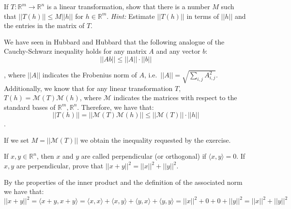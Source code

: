    \begin{exercise}{10}
        If $T: \mathbb{R}^m \rightarrow \mathbb{R}^n$ is a linear transformation, show that there is a number $M$ such that $\lvert \lvert T(h) \rvert \rvert \leq M \lvert \lvert h \rvert \rvert$ for $h \in \mathbb{R}^m$. \textit{Hint:} Estimate $\lvert \lvert T(h) \rvert \rvert$ in terms of $\lvert \lvert h \rvert \rvert$ and the entries in the matrix of $T$.
    \end{exercise}

    \begin{solution}

        We have seen in Hubbard and Hubbard that the following analogue of the Cauchy-Schwarz inequality holds for any matrix $A$ and any vector $b$:
        $$\lvert \lvert A b \rvert \rvert \leq \lvert \lvert A \rvert \rvert \cdot \lvert \lvert b \rvert \rvert$$

        , where $\lvert \lvert A \rvert \rvert$ indicates the Frobenius norm of $A$, i.e.\ $\lvert \lvert A \rvert \rvert = \sqrt{\sum_{i, j} A_{i, j}^2}$. Additionally, we know that for any linear transformation $T$, $T(h) = \mathcal{M}(T)\mathcal{M}(h)$, where $\mathcal{M}$ indicates the matrices with respect to the standard bases of $\mathbb{R}^m, \mathbb{R}^n$. Therefore, we have that:
        $$\lvert \lvert T(h) \rvert \rvert = \lvert \lvert \mathcal{M}(T) \mathcal{M}(h) \rvert \rvert \leq \lvert \lvert \mathcal{M}(T) \rvert \rvert \cdot \lvert \lvert h \rvert \rvert$$.

        If we set $M = \lvert \lvert \mathcal{M}(T) \rvert \rvert$ we obtain the inequality requested by the exercise.
    \end{solution}

    \begin{exercise}{13}
        If $x, y \in \mathbb{R}^n$, then $x$ and $y$ are called perpendicular (or orthogonal) if $\langle x, y \rangle = 0$. If $x, y$ are perpendicular, prove that $\lvert \lvert x + y \rvert \rvert^2 = \lvert \lvert x \rvert \rvert^2 + \lvert \lvert y \rvert \rvert^2$.
    \end{exercise}

    \begin{solution}

        By the properties of the inner product and the definition of the associated norm we have that:
        $$\lvert \lvert x + y \rvert \rvert^2 = \langle x + y, x + y \rangle = \langle x, x \rangle + \langle x, y \rangle + \langle y, x \rangle + \langle y, y \rangle = \lvert \lvert x \rvert \rvert^2 + 0 + 0 + \lvert \lvert y \rvert \rvert^2 = \lvert \lvert x \rvert \rvert^2 + \lvert \lvert y \rvert \rvert^2$$
    \end{solution}

